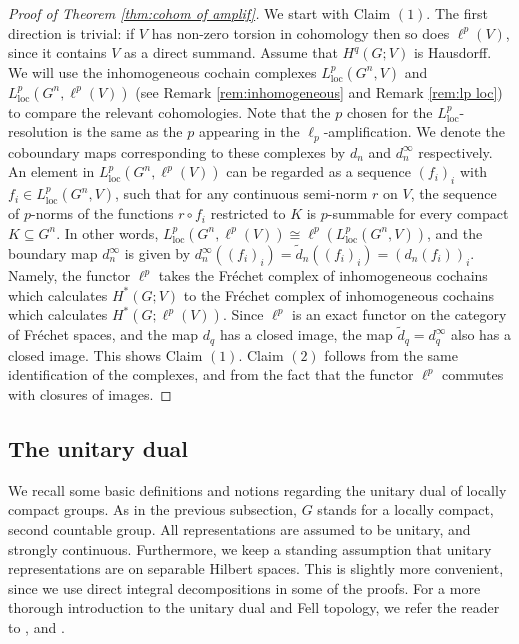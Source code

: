 \documentclass[12pt,reqno]{amsart}
\theoremstyle{definition}
\begin{document}
\begin{proof}[Proof of Theorem \ref{thm:cohom of amplif}]
    We start with Claim $(1)$. The first direction is trivial: if $V$ has non-zero torsion in cohomology then so does $\ell^p(V)$, since it contains $V$ as a direct summand. Assume that $H^q(G;V)$ is Hausdorff. We will use the inhomogeneous cochain complexes $L^p_{\mathrm{loc}}(G^n,V)$ and $L^p_{\mathrm{loc}}(G^n,\ell^p(V)) $ (see Remark \ref{rem:inhomogeneous} and Remark \ref{rem:lp loc}) to compare the relevant cohomologies. Note that the $p$ chosen for the $L^p_\mathrm{loc}$-resolution is the same as the $p$ appearing in the $\ell_p$-amplification. We denote the coboundary maps corresponding to these complexes by $d_n$ and $d_n^\infty$ respectively. An element in $L^p_{\mathrm{loc}}(G^n,\ell^p(V))$ can be regarded as a sequence $(f_i)_i$ with $f_i \in L^p_{\mathrm{loc}}(G^n,V)$, such that for any continuous semi-norm $r$ on $V$, the sequence of $p$-norms of the functions $r\circ f_i$ restricted to $K$ is $p$-summable for every compact $K \subseteq G^n$. In other words, $L^p_{\mathrm{loc}}(G^n,\ell^p(V)) \cong \ell^p(L^p_\mathrm{loc}(G^n,V))$, and the boundary map $d_n^\infty$ is given by $d_n^\infty((f_i)_i)=\tilde d_n((f_i)_i)=(d_n(f_i))_i$. Namely, the functor $\ell^p$ takes the Fr\'echet complex of inhomogeneous cochains which calculates $H^*(G;V)$ to the Fr\'echet complex of inhomogeneous cochains which calculates $H^*(G;\ell^p(V))$. Since $\ell^p$ is an exact functor on the category of Fr\'echet spaces, and the map $d_q$ has a closed image, the map $\tilde d_q=d_q^\infty$ also has a closed image. This shows Claim $(1)$. Claim $(2)$ follows from the same identification of the complexes, and from the fact that the functor $\ell^p$ commutes with closures of images. 
\end{proof}

\subsection{The unitary dual}\label{subsec:2.2}
We recall some basic definitions and notions regarding the unitary dual of locally compact groups. As in the previous subsection, $G$ stands for a locally compact, second countable group. All representations are assumed to be unitary, and strongly continuous. Furthermore, we keep a standing assumption that unitary representations are on separable Hilbert spaces. This is slightly more convenient, since we use direct integral decompositions in some of the proofs. For a more thorough introduction to the unitary dual and Fell topology, we refer the reader to \cite[\S 7]{Folland}, \cite[\S II.F]{bdlv} and \cite{Dixmier_cstar}.
\end{document}

